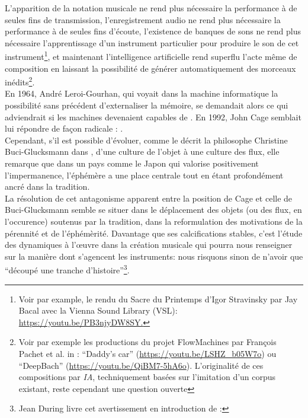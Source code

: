 \noindent L’apparition de la notation musicale ne rend plus nécessaire la performance à de seules fins de transmission, l’enregistrement audio ne rend plus nécessaire la performance à de seules fins d’écoute, l’existence de banques de sons ne rend plus nécessaire l’apprentissage d’un instrument particulier pour produire le son de cet instrument\footnote{Voir par example, le rendu du Sacre du Printemps d'Igor Stravinsky par Jay Bacal avec la Vienna Sound Library (VSL): \url{https://youtu.be/PB3njyDW8SY.}}, et maintenant l’intelligence artificielle rend superflu l'acte même de composition en laissant la possibilité de générer automatiquement des morceaux inédits\footnote{Voir par exemple les productions du projet FlowMachines par François Pachet et al. in \cite{hadjeres_deepbach:_2016}: “Daddy's car” (\url{https://youtu.be/LSHZ_b05W7o}) ou “DeepBach” (\url{https://youtu.be/QiBM7-5hA6o}). L'originalité de ces compositions par \textit{IA}, techniquement basées sur l'imitation d'un corpus existant, reste cependant une question ouverte}.\\
\indent En 1964, André Leroi-Gourhan, qui voyait dans la machine informatique la possibilité sans précédent d'externaliser la mémoire, se demandait alors ce qui adviendrait si les machines devenaient capables de \cite{leroi-gourhan_geste_1964}. En 1992, John Cage semblait lui répondre de façon radicale :  \cite{sebestik_ecoute_1992}. \\
\indent Cependant, s'il est possible d'évoluer, comme le décrit la philosophe Christine Buci-Glucksmann dans \cite{buci-glucksmann_esthetique_2003}, d'une culture de l'objet à une culture des flux, elle remarque que dans un pays comme le Japon qui valorise positivement l'impermanence, l'éphémère a une place centrale tout en étant profondément ancré dans la tradition.\\
\indent La résolution de cet antagonisme apparent entre la position de Cage et celle de Buci-Glucksmann semble se situer dans le déplacement des objets (ou des flux, en l'occurence) soutenus par la tradition, dans la reformulation des motivations de la pérennité et de l'éphémèrité. Davantage que ses calcifications stables, c'est l'étude des dynamiques à l'œuvre dans la création musicale qui pourra nous renseigner sur la manière dont s'agencent les instruments: nous risquons sinon de n'avoir que ``découpé une tranche d'histoire''\footnote{Jean During livre cet avertissement en introduction de \cite{during_quelque_1994} : }.

